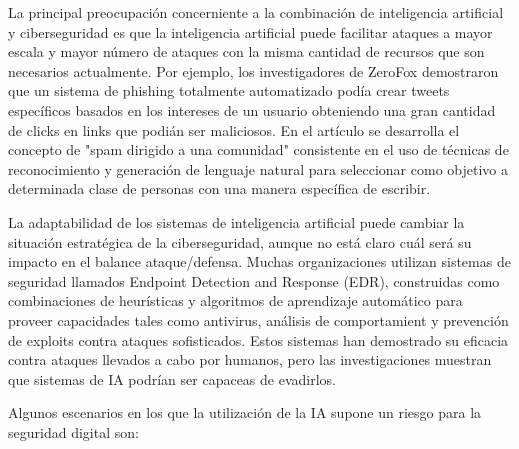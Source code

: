 \documentclass[12pt,a4paper]{article}
\begin{document}
La principal preocupación concerniente a la combinación de inteligencia artificial y ciberseguridad es que la inteligencia artificial puede facilitar ataques a mayor escala y mayor número de ataques con la misma cantidad de recursos que son necesarios actualmente.  Por ejemplo, los investigadores de ZeroFox demostraron que un sistema de phishing totalmente automatizado podía crear tweets específicos basados en los intereses de un usuario obteniendo una gran cantidad de clicks en links que podián ser maliciosos. En el artículo \cite{TargetedPhishing} se desarrolla el concepto de "spam dirigido a una comunidad" consistente en el uso de técnicas de reconocimiento y generación de lenguaje natural para seleccionar como objetivo a determinada clase de personas con una manera específica de escribir.

La adaptabilidad de los sistemas de inteligencia artificial puede cambiar la situación estratégica de la ciberseguridad, aunque no está claro cuál será su impacto en el balance ataque/defensa. Muchas organizaciones utilizan sistemas de seguridad llamados Endpoint Detection and Response (EDR), construidas como combinaciones de heurísticas y algoritmos de aprendizaje automático para proveer capacidades tales como antivirus, análisis de comportamient y prevención de exploits contra ataques sofisticados. Estos sistemas han demostrado su eficacia contra ataques llevados a cabo por humanos, pero las investigaciones muestran que sistemas de IA podrían ser capaceas de evadirlos.

Algunos escenarios en los que la utilización de la IA supone un riesgo para la seguridad digital son:
\end{document}
